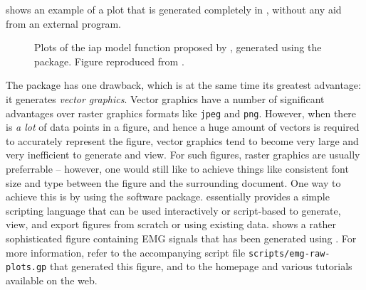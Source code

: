  shows an example of a plot that is generated completely in \pgfplots{}, without any aid from an external program.
\begin{figure}[htbp]
    \centering
    \newcommand*{\scalefactor}{0.5}
    \begin{tikzpicture}
      
    \end{tikzpicture}
  \caption[Plots of Rosenfalck's model function for the \acrlong{iap}]{Plots of the \acrfull{iap} model function proposed by \textcite{rosenfalck69}, generated using the \pgfplots{} package.
  Figure reproduced from \textcite{Petersen2015}.}
  \label{fig:rosenfalck}
\end{figure}

The \pgfplots{} package has one drawback, which is at the same time its greatest advantage: it generates \emph{vector graphics}.
Vector graphics have a number of significant advantages over raster graphics formats like \texttt{jpeg} and \texttt{png}.
However, when there is \emph{a lot} of data points in a figure, and hence a huge amount of vectors is required to accurately represent the figure, vector graphics tend to become very large and very inefficient to generate and view.
For such figures, raster graphics are usually preferrable -- however, one would still like to achieve things like consistent font size and type between the figure and the surrounding document.
One way to achieve this is by using the \gnuplot{} software package.
\gnuplot{} essentially provides a simple scripting language that can be used interactively or script-based to generate, view, and export figures from scratch or using existing data.
 shows a rather sophisticated figure containing EMG signals that has been generated using \gnuplot{}.
For more information, refer to the accompanying script file \texttt{scripts/emg-raw-plots.gp} that generated this figure, and to the \gnuplot{} homepage and various tutorials available on the web.
